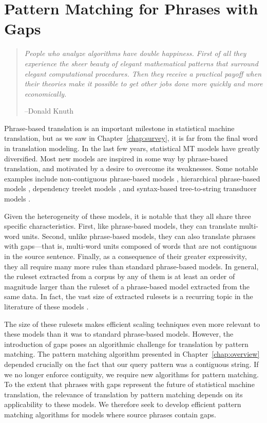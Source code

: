 \chapter{Pattern Matching for Phrases with Gaps}\label{chap:algorithms}

\begin{quote}
	{\em People who analyze algorithms have double happiness. First of all they experience the sheer beauty of elegant mathematical patterns that surround elegant computational procedures. Then they receive a practical payoff when their theories make it possible to get other jobs done more quickly and more economically.}  
	\begin{flushright}
		--Donald Knuth
	\end{flushright}
\end{quote}

Phrase-based translation is an important milestone in
statistical machine translation, but as we saw in Chapter~\ref{chap:survey},
it is far from the final word in translation modeling.  In the last few
years, statistical MT models have greatly diversified.
Most new models are inspired in some way by phrase-based translation, and motivated by
a desire to overcome its weaknesses.  Some notable examples include non-contiguous
phrase-based models \citep{Simard:2005:hlt-emnlp}, hierarchical phrase-based
models \citep[\textsection\ref{sec:hiero}]{Chiang:2005:acl,Chiang:2007:cl}, dependency treelet models
\citep{Quirk:2005:acl,Quirk:2006:hlt-naacl}, and syntax-based tree-to-string
transducer models \citep{Galley:2004:naacl,Galley:2006:acl,DeNeefe:2007:emnlp-conll}.

Given the heterogeneity of these models, it is notable that they all share
three specific characteristics.  First, like phrase-based models,
they can translate multi-word units.  Second, unlike phrase-based models,
they can also translate phrases with gaps---that is, multi-word
units composed of words that are not contiguous in the source sentence.
Finally, as a consequence of their greater expressivity, they
all require many more rules than standard phrase-based models.  In general,
the ruleset extracted from a corpus by any of them
is at least an order of magnitude larger than the ruleset of a phrase-based
model extracted from the same data.  In fact, the vast size of extracted
rulesets is a recurring topic in the literature of these models
\citep[see, e.g.][]{Chiang:2007:cl,DeNeefe:2007:emnlp-conll,Simard:2005:hlt-emnlp}.

The size of these rulesets makes efficient scaling techniques even 
more relevant to these models than it was to standard phrase-based models.
However, the introduction of gaps
poses an algorithmic challenge for translation by pattern matching.  The
pattern matching algorithm presented in Chapter~\ref{chap:overview} depended 
crucially on the fact that our query pattern was a contiguous string.  
If we no longer enforce contiguity, we
require new algorithms for pattern matching.  To the extent that phrases 
with gaps represent the future of statistical machine translation, the 
relevance of translation by pattern matching depends on its applicability
to these models.  We therefore seek to develop efficient pattern matching
algorithms for models where source phrases contain gaps.

